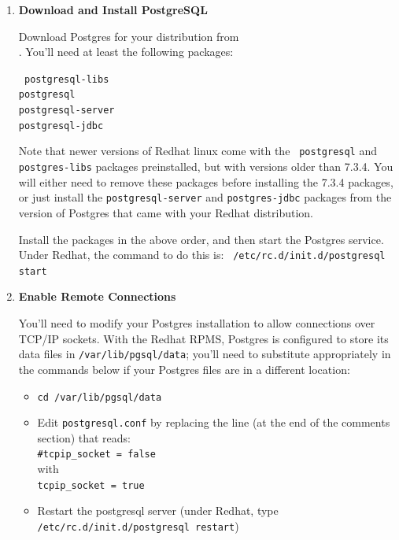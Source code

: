 \documentclass[11pt]{article}
\begin{document}
\begin{enumerate}
\item{\bf Download and Install PostgreSQL}

Download Postgres for your distribution from \\
.  
You'll need at least the following packages:

{\tt
postgresql-libs \\
postgresql \\
postgresql-server \\
postgresql-jdbc \\
}

Note that newer versions of Redhat linux come with the {\tt
postgresql} and {\tt postgres-libs} packages preinstalled, but with
versions older than 7.3.4.  You will either need to remove these
packages before installing the 7.3.4 packages, or just install the
{\tt postgresql-server} and {\tt postgres-jdbc} packages from the
version of Postgres that came with your Redhat distribution.

Install the packages in the above order, and then start the Postgres
service.  Under Redhat, the command to do this is: {\tt
/etc/rc.d/init.d/postgresql start}

\item{\bf Enable Remote Connections}

You'll need to modify your Postgres installation to allow connections over TCP/IP sockets.  With the Redhat RPMS, Postgres
is configured to store its data files in {\tt /var/lib/pgsql/data};  you'll need to substitute appropriately in the
commands below if your Postgres files are in a different location:

\begin{itemize}

\item {\tt cd /var/lib/pgsql/data}
\item Edit {\tt postgresql.conf} by
replacing the line (at the end of the comments section) that reads: \\
{\tt \#tcpip\_socket = false} \\
with \\
{\tt tcpip\_socket = true} \\
\item Restart the postgresql server (under Redhat, type {\tt /etc/rc.d/init.d/postgresql restart})
\end{itemize}


\end{enumerate}
\end{document}
